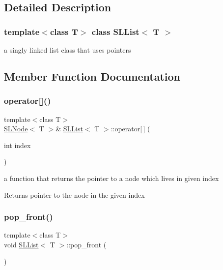 \subsection{Detailed Description}
\subsubsection*{template$<$class T$>$\newline
class S\+L\+List$<$ T $>$}

a singly linked list class that uses pointers 

\subsection{Member Function Documentation}
\mbox{\label{classSLList_a9099e03575aa4acf37a5885d227a96cf}} 
\subsubsection{\texorpdfstring{operator[]()}{operator[]()}}
{\footnotesize\ttfamily template$<$class T$>$ \\
\mbox{\hyperlink{classSLNode}{S\+L\+Node}}$<$ T $>$\& \mbox{\hyperlink{classSLList}{S\+L\+List}}$<$ T $>$\+::operator\mbox{[}$\,$\mbox{]} (\begin{DoxyParamCaption}\item[{int}]{index }\end{DoxyParamCaption})\hspace{0.3cm}{\ttfamily [inline]}}



a function that returns the pointer to a node which lives in given index 

\begin{DoxyReturn}{Returns}
pointer to the node in the given index 
\end{DoxyReturn}
\mbox{\label{classSLList_a081a289755af55c21a9cf89f21b48834}} 
\subsubsection{\texorpdfstring{pop\_front()}{pop\_front()}}
{\footnotesize\ttfamily template$<$class T$>$ \\
void \mbox{\hyperlink{classSLList}{S\+L\+List}}$<$ T $>$\+::pop\+\_\+front (\begin{DoxyParamCaption}{ }\end{DoxyParamCaption})\hspace{0.3cm}{\ttfamily [inline]}}



